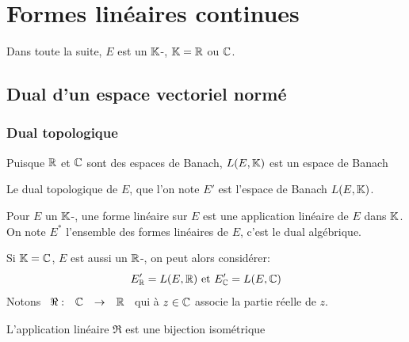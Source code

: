 \documentclass[]{report}
\begin{document}
    \chapter{Formes linéaires continues}

    Dans toute la suite, $E$ est un $\mathbb{K}$-\evn, $\mathbb{K}=\mathbb{R}$ ou $\mathbb{C}$.

    \section{Dual d'un espace vectoriel normé}

    \subsection*{Dual topologique}

    Puisque $\mathbb{R}$ et $\mathbb{C}$ sont des espaces de Banach, $L(E,\mathbb{K})$ est un espace de Banach

    \begin{df}{}{}
        Le dual topologique de $E$, que l'on note $E'$ est l'espace de Banach $L(E,\mathbb{K})$.
    \end{df}

    \begin{ra}{}{}
        Pour $E$ un $\mathbb{K}$-\ev, une forme linéaire sur $E$ est une application linéaire de $E$ dans $\mathbb{K}$. On note $E^*$ l'ensemble des formes linéaires de $E$, c'est le dual algébrique.
    \end{ra}

    \begin{re}{}{}
        Si $\mathbb{K}=\mathbb{C}$, $E$ est aussi un $\mathbb{R}$-\evn, on peut alors considérer:
        \[E_{\mathbb{R}}'=L(E,\mathbb{R})\text{ et }E_{\mathbb{C}}'=L(E,\mathbb{C})\]
        Notons $\begin{array}{ccccc} \Re : & \mathbb{C} & \to & \mathbb{R} \end{array}$ qui à $z\in \mathbb{C}$ associe la partie réelle de $z$.
    \end{re}

    \begin{prop}{}{}
        L'application linéaire $\Re$ est une bijection isométrique
    \end{prop}
\end{document}
